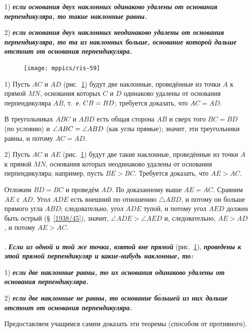 \documentclass[oneside]{book}
\begin{document}
1) \textbf{\emph{если основания двух наклонных одинаково удалены от основания перпендикуляра, то такие наклонные равны.}}

2) \textbf{\emph{если основания двух наклонных неодинаково удалены от основания перпендикуляра, то та из наклонных больше, основание которой дальше отстоит от основания перпендикуляра.}}

\begin{figure}
\centering
\texttt{[image: mppics/ris-59]}
\caption{}\label{1938/ris-59}
\end{figure}

1) Пусть $AC$ и $AD$ (рис.~\ref{1938/ris-59}) будут две наклонные, проведённые из точки $A$ к прямой $MN$, основания которых $C$ и $D$ одинаково удалены от основания перпендикуляра $AB$, т.~е. $CB\z=BD$;
требуется доказать, что $AC = AD$.

В треугольниках $ABC$ и $ABD$ есть общая сторона $AB$ и сверх того $BC=BD$ (по условию) и $\angle ABC \z= \angle ABD$ (как углы прямые);
значит, эти треугольники равны, и потому $AC = AD$.

2) Пусть $AC$ и $AE$ (рис.~\ref{1938/ris-59}) будут две такие наклонные, проведённые из точки $A$ к прямой $MN$, основания которых неодинаково удалены от основания перпендикуляра;
например, пусть $BE>BC$.
Требуется доказать, что $AE>AC$.

Отложим $BD=BC$ и проведём $AD$.
По доказанному выше $AE = AC$.
Сравним $AE$ с $AD$.
Угол $ADE$ есть внешний по отношению $\triangle ABD$, и потому он больше прямого угла $ABD$;
следовательно, угол $ADE$ тупой, и потому угол $AED$ должен быть острый (§~\ref{1938/45}), значит, $\angle ADE>\angle AED$ и, следовательно, $AE>AD$, и потому $AE>AC$.

\paragraph{}\label{1938/55}
.
\textbf{\emph{Если из одной и той же точки, взятой вне прямой}} (рис.~\ref{1938/ris-59}), \textbf{\emph{проведены к этой прямой перпендикуляр и какие-нибудь наклонные, то:}}

1) \textbf{\emph{если две наклонные равны, то их основания одинаково удалены от основания перпендикуляра.}}

2) \textbf{\emph{если две наклонные не равны, то основание б\'{о}льшей из них дальше отстоит от основания перпендикуляра.}}

Предоставляем учащимся самим доказать эти теоремы (способом от противного).
\end{document}
